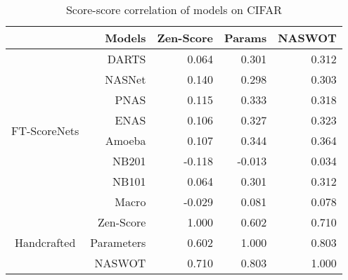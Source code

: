 \documentclass[lettersize,journal]{IEEEtran}
\begin{document}
            \begin{table}
                \caption{Score-score correlation of models on CIFAR}
                \label{tab:score_score_correlation}
                \centering
                \begin{tabular}{c|r|rrr}
                \toprule
                   & Models & Zen-Score & Params & NASWOT\\
                    \midrule
                    \multirow{8}{*}{FT-ScoreNets} 
                     & DARTS   & 0.064 & 0.301 & 0.312 \\
                     & NASNet  & 0.140 & 0.298 & 0.303 \\
                     & PNAS    & 0.115 & 0.333 & 0.318 \\
                     & ENAS    & 0.106 & 0.327 & 0.323 \\
                     & Amoeba  & 0.107 & 0.344 & 0.364 \\
                     & NB201   & -0.118 & -0.013 & 0.034 \\
                     & NB101   & 0.064 & 0.301 & 0.312 \\
                     & Macro   & -0.029 & 0.081 & 0.078 \\
                    \midrule
                    \multirow{3}{*}{Handcrafted}
                     & Zen-Score \cite{Zen-NAS} & 1.000 & 0.602 & 0.710\\
                     & Parameters & 0.602 & 1.000 & 0.803\\
                     & NASWOT \cite{naswot} & 0.710 & 0.803 & 1.000 \\
                \bottomrule
              \end{tabular}
            \end{table}
\end{document}

